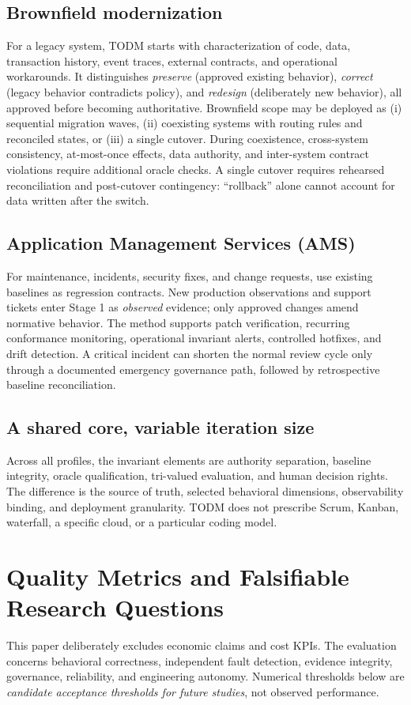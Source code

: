 \documentclass[11pt,a4paper]{article}
\newcommand{\todm}{\textsc{TODM}}
\begin{document}
\subsection{Brownfield modernization}
For a legacy system, TODM starts with characterization of code, data, transaction history, event traces, external contracts, and operational workarounds. It distinguishes \emph{preserve} (approved existing behavior), \emph{correct} (legacy behavior contradicts policy), and \emph{redesign} (deliberately new behavior), all approved before becoming authoritative. Brownfield scope may be deployed as (i) sequential migration waves, (ii) coexisting systems with routing rules and reconciled states, or (iii) a single cutover. During coexistence, cross-system consistency, at-most-once effects, data authority, and inter-system contract violations require additional oracle checks. A single cutover requires rehearsed reconciliation and post-cutover contingency: ``rollback'' alone cannot account for data written after the switch.

\subsection{Application Management Services (AMS)}
For maintenance, incidents, security fixes, and change requests, use existing baselines as regression contracts. New production observations and support tickets enter Stage 1 as \emph{observed} evidence; only approved changes amend normative behavior. The method supports patch verification, recurring conformance monitoring, operational invariant alerts, controlled hotfixes, and drift detection. A critical incident can shorten the normal review cycle only through a documented emergency governance path, followed by retrospective baseline reconciliation.

\subsection{A shared core, variable iteration size}
Across all profiles, the invariant elements are authority separation, baseline integrity, oracle qualification, tri-valued evaluation, and human decision rights. The difference is the source of truth, selected behavioral dimensions, observability binding, and deployment granularity. \todm{} does not prescribe Scrum, Kanban, waterfall, a specific cloud, or a particular coding model.

\section{Quality Metrics and Falsifiable Research Questions}
This paper deliberately excludes economic claims and cost KPIs. The evaluation concerns behavioral correctness, independent fault detection, evidence integrity, governance, reliability, and engineering autonomy. Numerical thresholds below are \emph{candidate acceptance thresholds for future studies}, not observed performance.
\end{document}
